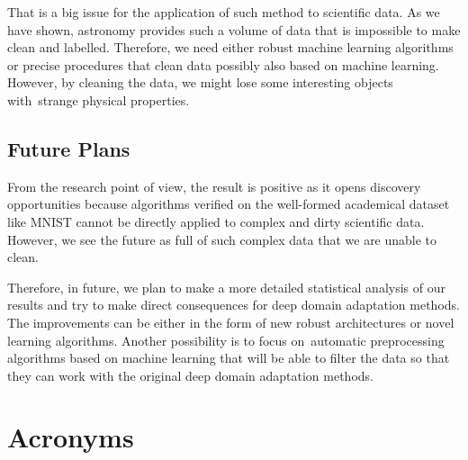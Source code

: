 \documentclass[thesis=M,english]{FITthesis}[2012/10/20]
\begin{document}
That is a big issue for the application of such method to scientific data.
As we have shown, astronomy provides such a volume of data that is impossible to make clean and labelled.
Therefore, we need either robust machine learning algorithms or precise procedures
that clean data possibly also based on machine learning.
However, by cleaning the data, we might lose some interesting objects with~strange physical properties.

\section{Future Plans}

From the research point of view, the result is positive as it opens discovery opportunities because algorithms verified on the well-formed academical dataset like MNIST cannot be directly applied to complex and dirty scientific data. However, we see the future as full of such complex data that we are unable to clean.

Therefore, in future, we plan to make a more detailed statistical analysis of our results and try to make direct consequences for deep domain adaptation methods. The improvements can be either in the form of new robust architectures or novel learning algorithms. Another possibility is to focus on~automatic preprocessing algorithms based on machine learning that will be able to filter the data so that they can work with the original deep domain adaptation methods.




\appendix



\chapter{Acronyms}
\end{document}
